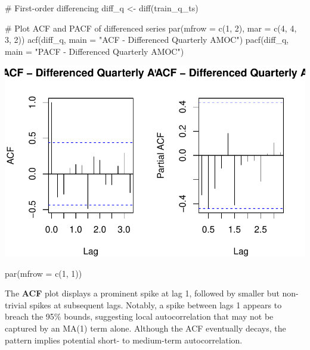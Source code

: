 \documentclass[
  11pt,
]{article}
\newenvironment{Shaded}{\begin{snugshade}}{\end{snugshade}}
\newcommand{\AttributeTok}[1]{\textcolor[rgb]{0.40,0.45,0.13}{#1}}
\newcommand{\CommentTok}[1]{\textcolor[rgb]{0.37,0.37,0.37}{#1}}
\newcommand{\DecValTok}[1]{\textcolor[rgb]{0.68,0.00,0.00}{#1}}
\newcommand{\FunctionTok}[1]{\textcolor[rgb]{0.28,0.35,0.67}{#1}}
\newcommand{\NormalTok}[1]{\textcolor[rgb]{0.00,0.23,0.31}{#1}}
\newcommand{\OtherTok}[1]{\textcolor[rgb]{0.00,0.23,0.31}{#1}}
\newcommand{\StringTok}[1]{\textcolor[rgb]{0.13,0.47,0.30}{#1}}
\begin{document}
\begin{Shaded}
\begin{Highlighting}[]
\CommentTok{\# First{-}order differencing}
\NormalTok{diff\_q }\OtherTok{\textless{}{-}} \FunctionTok{diff}\NormalTok{(train\_q\_ts)}

\CommentTok{\# Plot ACF and PACF of differenced series}
\FunctionTok{par}\NormalTok{(}\AttributeTok{mfrow =} \FunctionTok{c}\NormalTok{(}\DecValTok{1}\NormalTok{, }\DecValTok{2}\NormalTok{), }\AttributeTok{mar =} \FunctionTok{c}\NormalTok{(}\DecValTok{4}\NormalTok{, }\DecValTok{4}\NormalTok{, }\DecValTok{3}\NormalTok{, }\DecValTok{2}\NormalTok{))}
\FunctionTok{acf}\NormalTok{(diff\_q, }\AttributeTok{main =} \StringTok{"ACF {-} Differenced Quarterly AMOC"}\NormalTok{)}
\FunctionTok{pacf}\NormalTok{(diff\_q, }\AttributeTok{main =} \StringTok{"PACF {-} Differenced Quarterly AMOC"}\NormalTok{)}
\end{Highlighting}
\end{Shaded}

\includegraphics{project_files/figure-pdf/unnamed-chunk-45-1.pdf}

\begin{Shaded}
\begin{Highlighting}[]
\FunctionTok{par}\NormalTok{(}\AttributeTok{mfrow =} \FunctionTok{c}\NormalTok{(}\DecValTok{1}\NormalTok{, }\DecValTok{1}\NormalTok{))}
\end{Highlighting}
\end{Shaded}

The \textbf{ACF} plot displays a prominent spike at lag 1, followed by
smaller but non-trivial spikes at subsequent lags. Notably, a spike
between lags 1 appears to breach the 95\% bounds, suggesting local
autocorrelation that may not be captured by an MA(1) term alone.
Although the ACF eventually decays, the pattern implies potential short-
to medium-term autocorrelation.
\end{document}
